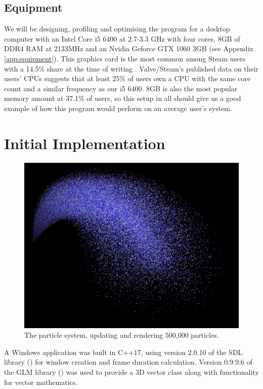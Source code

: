 \documentclass[11pt, a4paper, twocolumn]{article}
\begin{document}
\subsection{Equipment}

We will be designing, profiling and optimising the program for a desktop computer with an Intel Core i5 6400 at 2.7-3.3 GHz with four cores, 8GB of DDR4 RAM at 2133MHz and an Nvidia Geforce GTX 1060 3GB (see Appendix \ref{app:equipment}). This  graphics card is the most common among Steam users with a 14.5\% share at the time of writing \citep{SteamSurvey}. Valve/Steam's published data on their users' CPUs suggests that at least 25\% of users own a CPU with the same core count and a similar frequency as our i5 6400. 8GB is also the most popular memory amount at 37.1\% of users, so this setup in all should give us a good example of how this program would perform on an average user's system.

\section{Initial Implementation}

\begin{figure}[h]
\includegraphics[width=\linewidth]{particles}
\caption{The particle system, updating and rendering 500,000 particles.}
\label{fig:particles}
\end{figure}

A Windows application was built in C++17, using version 2.0.10 of the SDL library (\citeyear{SDL2}) for window creation and frame duration calculation. Version 0.9.9.6 of the GLM library (\citeyear{GLM}) was used to provide a 3D vector class along with functionality for vector mathematics.
\end{document}
